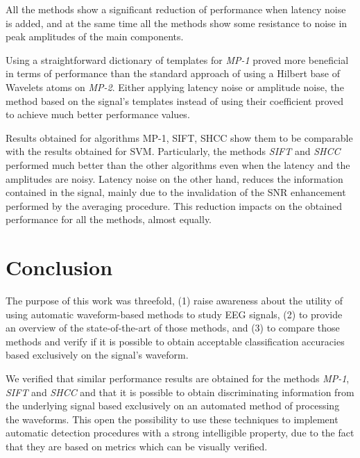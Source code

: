 \documentclass[brainsci,article,submit,moreauthors,pdftex,10pt,a4paper]{mdpi}
\begin{document}
All the methods show a significant reduction of performance when latency noise is added, and at the same time all the methods show some resistance to noise in peak amplitudes of the main components.

Using a straightforward dictionary of templates for \textit{MP-1} proved more beneficial in terms of performance than the standard approach of using a Hilbert base of Wavelets atoms on \textit{MP-2}.  Either applying latency noise or amplitude noise, the method based on the signal's templates instead of using their coefficient proved to achieve much better performance values.

Results obtained for algorithms MP-1, SIFT, SHCC show them to be comparable with the results obtained for SVM.  Particularly, the methods \textit{SIFT} and \textit{SHCC} performed much better than the other algorithms even when the latency and the amplitudes are noisy.  Latency noise on the other hand, reduces the information contained in the signal, mainly due to the invalidation of the SNR enhancement performed by the averaging procedure.  This reduction impacts on the obtained performance for all the methods, almost equally.

\section{Conclusion}
\label{section:conclusion}

The purpose of this work was threefold, (1) raise awareness about the utility of using automatic waveform-based methods to study EEG signals, (2) to provide an overview of the state-of-the-art of those methods, and (3) to compare those methods and verify if it is possible to obtain acceptable classification accuracies based exclusively on the signal's waveform.

We verified that similar performance results are obtained for the methods \textit{MP-1}, \textit{SIFT} and \textit{SHCC} and that it is possible to obtain discriminating information from the underlying signal based exclusively on an automated method of processing the waveforms.  This open the possibility to use these techniques to implement automatic detection procedures with a strong intelligible property, due to the fact that they are based on metrics which can be visually verified.

\end{document}
